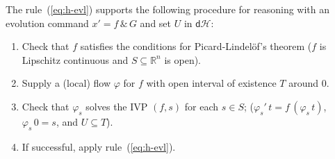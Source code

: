 \documentclass[envcountsame,envcountsect]{llncs}
\newcommand{\dH}{\mathsf{d}\mathcal{H}}
\newcommand{\flow}{\varphi}
\newcommand{\reals}{\mathbb{R}}
\begin{document}
The rule~(\ref{eq:h-evl}) supports the following procedure
for reasoning with an evolution command $x' = f\, \&\, G$ and set $U$
in $\dH$:
\begin{enumerate}
\item Check that $f$ satisfies the conditions for Picard-Lindel\"of's
  theorem ($f$ is Lipschitz continuous and $S\subseteq\reals^n$ is
  open).
\item Supply a (local) flow $\flow$ for $f$ with open interval of
  existence $T$ around $0$.
\item Check that $\flow_s$ solves the IVP $(f,s)$ for each $s\in S$;
  ($\flow_s'\, t = f\, (\flow_s\, t)$, $\flow_s\, 0 = s$, and
  $U\subseteq T$).
\item If successful, apply rule~(\ref{eq:h-evl}).
\end{enumerate}
\end{document}
